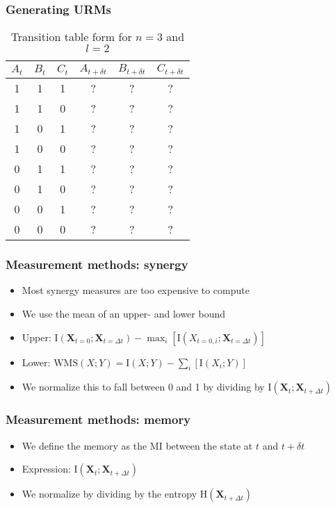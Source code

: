 \documentclass[hyperref={pdfpagelabels=false}]{beamer}
\begin{document}
\begin{frame}
\frametitle{Generating URMs}
\begin{table}[ht]
\begin{center}
\begin{tabular}{|c|c|c||c|c|c|}
\hline
$A_t$ & $B_t$ & $C_t$ & $A_{t+\delta t}$ & $B_{t+\delta t}$ & $C_{t+\delta t}$ \\
\hline
\hline
1 & 1 & 1 & ? & ? & ? \\
1 & 1 & 0 & ? & ? & ? \\
1 & 0 & 1 & ? & ? & ? \\
1 & 0 & 0 & ? & ? & ? \\
0 & 1 & 1 & ? & ? & ? \\
0 & 1 & 0 & ? & ? & ? \\
0 & 0 & 1 & ? & ? & ? \\
0 & 0 & 0 & ? & ? & ? \\
\hline
\end{tabular}
\end{center}
\caption{Transition table form for $n=3$ and $l=2$}
\end{table}
\end{frame}

\begin{frame}
\frametitle{Measurement methods: synergy}
\begin{itemize}
\item Most synergy measures are too expensive to compute
\item We use the mean of an upper- and lower bound
\item Upper: $\mathrm{I}\left( \mathbf{X}_{t=0}; \mathbf{X}_{t=\Delta t} \right) - \max_i [\mathrm{I}\left( X_{t=0,i};\mathbf{X}_{t=\Delta t}\right)]$
\item Lower: $\mathrm{WMS} \left( X;Y \right) = \mathrm{I} \left( X;Y \right) - \sum_i [\mathrm{I} \left( X_i;Y \right)]$
\item We normalize this to fall between 0 and 1 by dividing by $\mathrm{I}\left( \mathbf{X}_t ; \mathbf{X}_{t + \Delta t}\right)$
\end{itemize}
\end{frame}

\begin{frame}
\frametitle{Measurement methods: memory}
\begin{itemize}
\item We define the memory as the MI between the state at $t$ and $t + \delta t$
\item Expression: $\mathrm{I}\left(\mathbf{X}_t ; \mathbf{X}_{t + \Delta t}\right)$
\item We normalize by dividing by the entropy $\mathrm{H}\left(\mathbf{X}_{t + \Delta t}\right)$
\end{itemize}
\end{frame}
\end{document}
